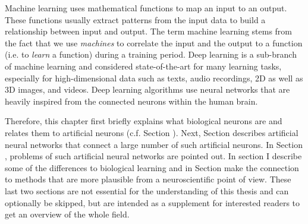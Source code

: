 

Machine learning uses mathematical functions to map an input to an output.
These functions usually extract patterns from the input data to build a relationship between input and output.
The term machine learning stems from the fact that we use \emph{machines} to correlate the input and the output to a function (i.e. to \emph{learn} a function) during a training period.
Deep learning is a sub-branch of machine learning and considered state-of-the-art for many learning tasks, especially for high-dimensional data such as texts, audio recordings, 2D as well as 3D images, and videos.
Deep learning algorithms use neural networks that are heavily inspired from the connected neurons within the human brain.

Therefore, this chapter first briefly explains what biological neurons are and relates them to artificial neurons (c.f. Section ).
Next, Section  describes artificial neural networks that connect a large number of such artificial neurons.
In Section , problems of such artificial neural networks are pointed out.
In section  I describe some of the differences to biological learning and in Section  make the connection to methods that are more plausible from a neuroscientific point of view.
These last two sections are not essential for the understanding of this thesis and can optionally be skipped, but are intended as a supplement for interested readers to get an overview of the whole field.


